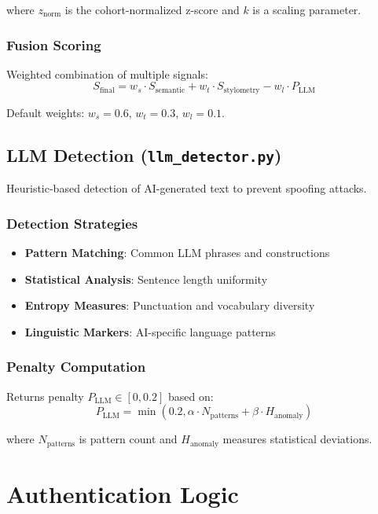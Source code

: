 \documentclass[12pt,a4paper]{article}
\begin{document}
where $z_{\text{norm}}$ is the cohort-normalized z-score and $k$ is a scaling parameter.

\subsubsection{Fusion Scoring}
Weighted combination of multiple signals:
\begin{equation}
S_{\text{final}} = w_s \cdot S_{\text{semantic}} + w_t \cdot S_{\text{stylometry}} - w_l \cdot P_{\text{LLM}}
\end{equation}

Default weights: $w_s = 0.6$, $w_t = 0.3$, $w_l = 0.1$.

\subsection{LLM Detection (\texttt{llm\_detector.py})}

Heuristic-based detection of AI-generated text to prevent spoofing attacks.

\subsubsection{Detection Strategies}
\begin{itemize}
    \item \textbf{Pattern Matching}: Common LLM phrases and constructions
    \item \textbf{Statistical Analysis}: Sentence length uniformity
    \item \textbf{Entropy Measures}: Punctuation and vocabulary diversity
    \item \textbf{Linguistic Markers}: AI-specific language patterns
\end{itemize}

\subsubsection{Penalty Computation}
Returns penalty $P_{\text{LLM}} \in [0, 0.2]$ based on:
\begin{equation}
P_{\text{LLM}} = \min(0.2, \alpha \cdot N_{\text{patterns}} + \beta \cdot H_{\text{anomaly}})
\end{equation}

where $N_{\text{patterns}}$ is pattern count and $H_{\text{anomaly}}$ measures statistical deviations.

\section{Authentication Logic}
\end{document}
